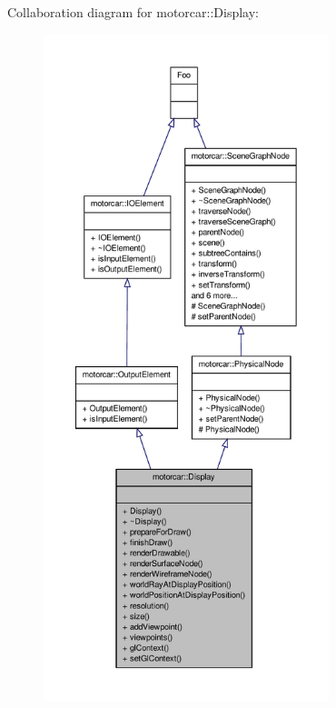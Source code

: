 Collaboration diagram for motorcar\-:\-:Display\-:
\nopagebreak
\begin{figure}[H]
\begin{center}
\leavevmode
\includegraphics[height=550pt]{classmotorcar_1_1Display__coll__graph}
\end{center}
\end{figure}
